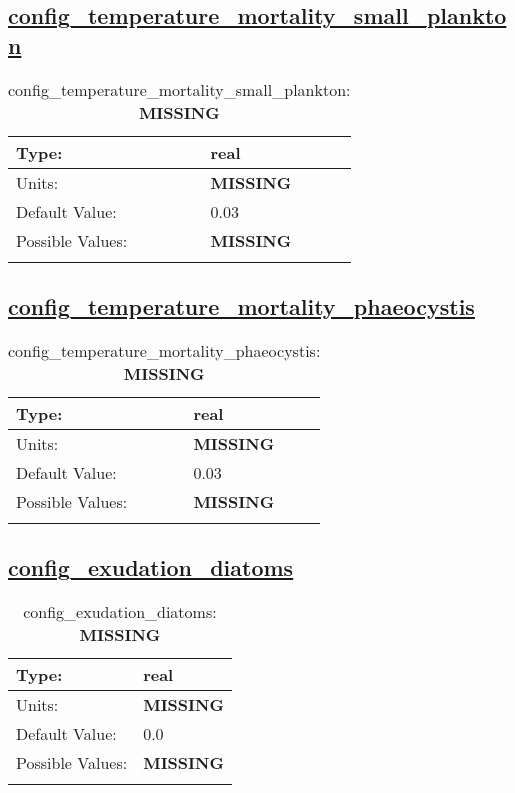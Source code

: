 \subsection[config\_temperature\_mortality\_small\_plankton]{\hyperref[sec:nm_tab_biogeochemistry]{config\_temperature\_mortality\_small\_plankton}}
\label{subsec:nm_sec_config_temperature_mortality_small_plankton}
\begin{center}
\begin{longtable}{| p{2.0in} || p{4.0in} |}
    \hline
    Type: & real \\
    \hline
    Units: & {\bf \color{red} MISSING} \\
    \hline
    Default Value: & 0.03 \\
    \hline
    Possible Values: & {\bf \color{red} MISSING} \\
    \hline
    \caption{config\_temperature\_mortality\_small\_plankton: {\bf \color{red} MISSING}}
\end{longtable}
\end{center}
\subsection[config\_temperature\_mortality\_phaeocystis]{\hyperref[sec:nm_tab_biogeochemistry]{config\_temperature\_mortality\_phaeocystis}}
\label{subsec:nm_sec_config_temperature_mortality_phaeocystis}
\begin{center}
\begin{longtable}{| p{2.0in} || p{4.0in} |}
    \hline
    Type: & real \\
    \hline
    Units: & {\bf \color{red} MISSING} \\
    \hline
    Default Value: & 0.03 \\
    \hline
    Possible Values: & {\bf \color{red} MISSING} \\
    \hline
    \caption{config\_temperature\_mortality\_phaeocystis: {\bf \color{red} MISSING}}
\end{longtable}
\end{center}
\subsection[config\_exudation\_diatoms]{\hyperref[sec:nm_tab_biogeochemistry]{config\_exudation\_diatoms}}
\label{subsec:nm_sec_config_exudation_diatoms}
\begin{center}
\begin{longtable}{| p{2.0in} || p{4.0in} |}
    \hline
    Type: & real \\
    \hline
    Units: & {\bf \color{red} MISSING} \\
    \hline
    Default Value: & 0.0 \\
    \hline
    Possible Values: & {\bf \color{red} MISSING} \\
    \hline
    \caption{config\_exudation\_diatoms: {\bf \color{red} MISSING}}
\end{longtable}
\end{center}
